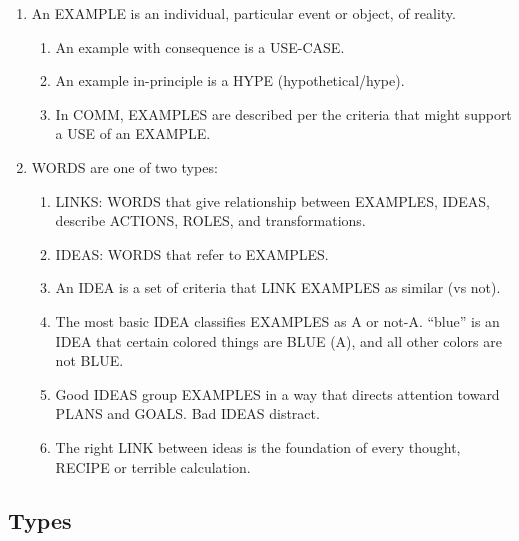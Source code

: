 \documentclass[
]{book}
\providecommand{\tightlist}{%
  \setlength{\itemsep}{0pt}\setlength{\parskip}{0pt}}
\begin{document}
\begin{enumerate}
\def\labelenumi{\arabic{enumi}.}
\setcounter{enumi}{44}
\tightlist
\item
  An EXAMPLE is an individual, particular event or object, of reality.

  \begin{enumerate}
  \def\labelenumii{\arabic{enumii}.}
  \tightlist
  \item
    An example with consequence is a USE-CASE.
  \item
    An example in-principle is a HYPE (hypothetical/hype).
  \item
    In COMM, EXAMPLES are described per the criteria that might support a USE of an EXAMPLE.
  \end{enumerate}
\item
  WORDS are one of two types:

  \begin{enumerate}
  \def\labelenumii{\arabic{enumii}.}
  \tightlist
  \item
    LINKS: WORDS that give relationship between EXAMPLES, IDEAS, describe ACTIONS, ROLES, and transformations.
  \item
    IDEAS: WORDS that refer to EXAMPLES.
  \item
    An IDEA is a set of criteria that LINK EXAMPLES as similar (vs not).
  \item
    The most basic IDEA classifies EXAMPLES as A or not-A. ``blue'' is
    an IDEA that certain colored things are BLUE (A), and all other
    colors are not BLUE.
  \item
    Good IDEAS group EXAMPLES in a way that directs attention
    toward PLANS and GOALS. Bad IDEAS distract.
  \item
    The right LINK between ideas is the foundation of every thought, RECIPE or terrible calculation.
  \end{enumerate}
\end{enumerate}

\hypertarget{types-1}{%
\subsection{Types}\label{types-1}}
\end{document}
